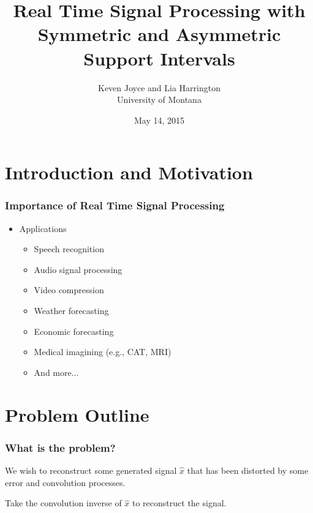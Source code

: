 \documentclass[t]{beamer}
\title{Real Time Signal Processing with Symmetric and Asymmetric Support Intervals}
\author{Keven Joyce and Lia Harrington \\
       University of Montana}
\date{May 14, 2015}
\begin{document}
\begin{frame}
\titlepage
\end{frame}
\section{Introduction and Motivation}
\begin{frame}
\frametitle{Importance of Real Time Signal Processing}
\vspace{.3cm}
\vspace{.3cm}
\begin{itemize}
\item Applications
\begin{itemize}
\item Speech recognition
\item Audio signal processing
\item Video compression
\item Weather forecasting
\item Economic forecasting
\item Medical imagining (e.g., CAT, MRI)
\item And more...
\end{itemize}
\end{itemize}
\end{frame}
\section{Problem Outline}
\begin{frame}
\frametitle{What is the problem?}
 We wish to reconstruct some generated signal $\hat{x}$ that has been distorted by some error and convolution processes. \newline \vspace{.5cm}

 Take the convolution inverse of $\hat{x}$ to reconstruct the signal. 
\end{frame}
\end{document}
